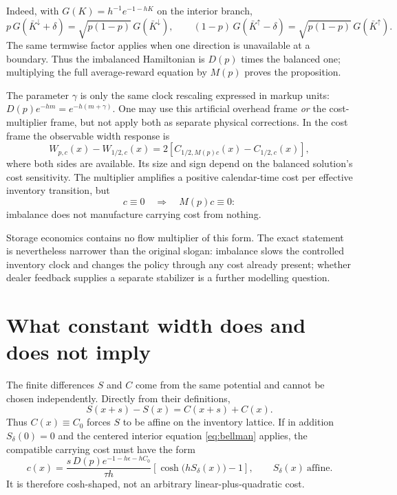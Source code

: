 \documentclass[11pt]{article}
\begin{document}
Indeed, with $G(K)=h^{-1}e^{-1-hK}$ on the interior branch,
\[
p\,G(\bar K^\downarrow+\delta)
=\sqrt{p(1-p)}\,G(\bar K^\downarrow),\qquad
(1-p)\,G(\bar K^\uparrow-\delta)
=\sqrt{p(1-p)}\,G(\bar K^\uparrow).
\]
The same termwise factor applies when one direction is unavailable at a boundary. Thus the imbalanced Hamiltonian is $D(p)$ times the balanced one; multiplying the full average-reward equation by $M(p)$ proves the proposition.

The parameter $\gamma$ is only the same clock rescaling expressed in markup units:
$D(p)e^{-hm}=e^{-h(m+\gamma)}$. One may use this artificial overhead frame \emph{or} the cost-multiplier frame, but not apply both as separate physical corrections. In the cost frame the observable width response is
\begin{equation}
W_{p,c}(x)-W_{1/2,c}(x)
=2\left[C_{1/2,M(p)c}(x)-C_{1/2,c}(x)\right],
\label{eq:widthresponse}
\end{equation}
where both sides are available. Its size and sign depend on the balanced solution's cost sensitivity. The multiplier amplifies a positive calendar-time cost per effective inventory transition, but
\[
c\equiv0\quad\Longrightarrow\quad M(p)c\equiv0:
\]
imbalance does not manufacture carrying cost from nothing.

Storage economics contains no flow multiplier of this form. The exact statement is nevertheless narrower than the original slogan: imbalance slows the controlled inventory clock and changes the policy through any cost already present; whether dealer feedback supplies a separate stabilizer is a further modelling question.

\section{What constant width does and does not imply}\label{sec:cwls}

The finite differences $S$ and $C$ come from the same potential and cannot be chosen independently. Directly from their definitions,
\begin{equation}
S(x+s)-S(x)=C(x+s)+C(x).
\label{eq:compatibility}
\end{equation}
Thus $C(x)\equiv C_0$ forces $S$ to be affine on the inventory lattice. If in addition $S_\delta(0)=0$ and the centered interior equation \eqref{eq:bellman} applies, the compatible carrying cost must have the form
\begin{equation}
c(x)=\frac{s\,D(p)e^{-1-h\epsilon-hC_0}}{\tau h}
\left[\cosh\!\big(hS_\delta(x)\big)-1\right],
\qquad S_\delta(x)\ \text{affine}.
\label{eq:cwlscost}
\end{equation}
It is therefore cosh-shaped, not an arbitrary linear-plus-quadratic cost.
\end{document}

